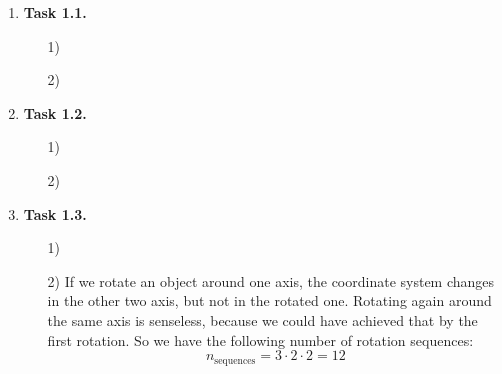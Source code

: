 \documentclass[a4paper,11pt]{article}
\author{\authorinfo}
\title{\titleinfo}
\date{\today}
\begin{document}
\maketitle
\begin {enumerate}
\item[\textbf{Task 1.1.}]

    \begin{enumerate}
        \item[1)]
        \item[2)]
    \end{enumerate}

\item[\textbf{Task 1.2.}]

    \begin{enumerate}
        \item[1)]
        \item[2)]
    \end{enumerate}

\item[\textbf{Task 1.3.}]

    \begin{enumerate}
        \item[1)]
        \item[2)] If we rotate an object around one axis, the coordinate system changes in the other two axis, but not in the rotated one. Rotating again around the same axis is senseless, because we could have achieved that by the first rotation. So we have the following number of rotation sequences:
        $$n_{\text{sequences}} = 3 \cdot 2 \cdot 2 = 12$$
    \end{enumerate}

\end {enumerate}
\end{document}
